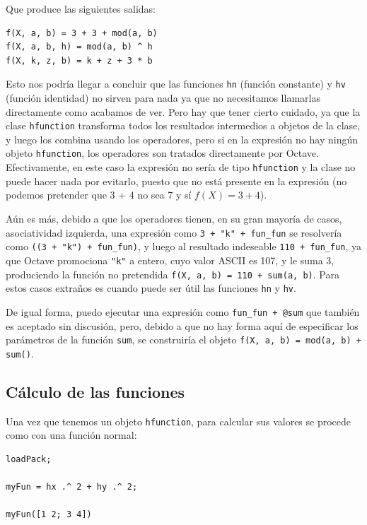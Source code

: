 \documentclass{article}
\begin{document}
Que produce las siguientes salidas:

\begin{verbatim}
f(X, a, b) = 3 + 3 + mod(a, b)
f(X, a, b, h) = mod(a, b) ^ h
f(X, k, z, b) = k + z + 3 * b
\end{verbatim}

Esto nos podría llegar a concluir que las funciones \texttt{hn}
(función constante) y \texttt{hv} (función identidad) no sirven para
nada ya que no necesitamos llamarlas directamente como acabamos de
ver. Pero hay que tener cierto cuidado, ya
que la clase \texttt{hfunction} transforma todos los resultados
intermedios a objetos de la clase, y luego los combina usando los
operadores, pero si en la expresión no hay ningún objeto
\texttt{hfunction}, los operadores son tratados directamente por
Octave. Efectivamente, en este caso la expresión no sería de tipo
\texttt{hfunction} y la clase no puede hacer nada por evitarlo, puesto
que no está presente en la expresión (no podemos pretender que 3 + 4
no sea 7 y sí $f(X) = 3 + 4$).

Aún es más, debido a que los operadores tienen, en su gran mayoría de
casos, asociatividad izquierda, una expresión como \texttt{3 + "k"{} +
  fun\_fun} se resolvería como \texttt{((3 + "k"{}) + fun\_fun)}, y luego
al resultado indeseable \texttt{110 + fun\_fun}, ya que Octave
promociona \texttt{"k"} a entero, cuyo valor ASCII es 107, y le suma 3,
produciendo la función no pretendida \texttt{f(X, a, b) = 110 + sum(a,
  b)}. Para estos casos extraños es cuando puede ser útil las
funciones \texttt{hn} y \texttt{hv}.

De igual forma, puedo ejecutar una expresión como \texttt{fun\_fun +
  @sum} que también es aceptado sin discusión, pero, debido a que no
hay forma aquí de especificar los parámetros de la función
\texttt{sum}, se construiría el objeto \texttt{f(X, a, b) = mod(a, b)
  + sum()}.

\subsection{Cálculo de las funciones}
\label{ssec:calc}
Una vez que tenemos un objeto \texttt{hfunction}, para calcular sus
valores se procede como con una función normal:

\begin{verbatim}
loadPack;

myFun = hx .^ 2 + hy .^ 2;

myFun([1 2; 3 4])
\end{verbatim}
\end{document}

